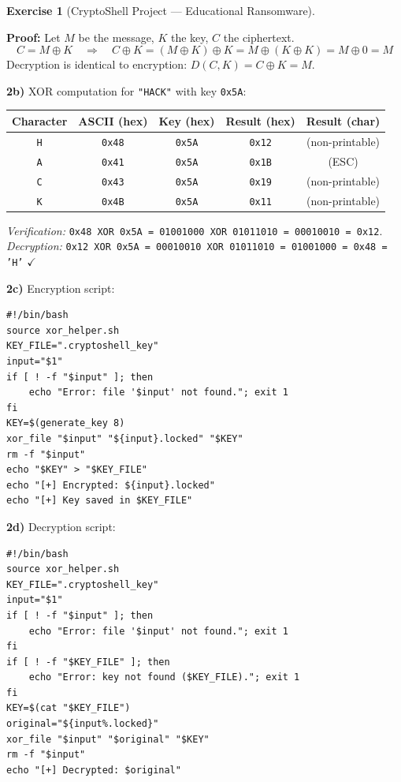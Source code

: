 \documentclass[a4paper,11pt]{article}
\theoremstyle{plain}
\theoremstyle{definition}
\newtheorem{exercice}{Exercise}
\begin{document}
\begin{exercice}[CryptoShell Project --- Educational Ransomware]
\begin{correction}
\textbf{Proof:} Let $M$ be the message, $K$ the key, $C$ the ciphertext.
\[C = M \oplus K \quad \Rightarrow \quad C \oplus K = (M \oplus K) \oplus K = M \oplus (K \oplus K) = M \oplus 0 = M\]
Decryption is identical to encryption: $D(C, K) = C \oplus K = M$.

\medskip
\textbf{2b)} XOR computation for \texttt{"HACK"} with key \texttt{0x5A}:

\begin{center}
\begin{tabular}{ccccc}
\toprule
\textbf{Character} & \textbf{ASCII (hex)} & \textbf{Key (hex)} & \textbf{Result (hex)} & \textbf{Result (char)} \\
\midrule
\texttt{H} & \texttt{0x48} & \texttt{0x5A} & \texttt{0x12} & (non-printable) \\
\texttt{A} & \texttt{0x41} & \texttt{0x5A} & \texttt{0x1B} & (ESC) \\
\texttt{C} & \texttt{0x43} & \texttt{0x5A} & \texttt{0x19} & (non-printable) \\
\texttt{K} & \texttt{0x4B} & \texttt{0x5A} & \texttt{0x11} & (non-printable) \\
\bottomrule
\end{tabular}
\end{center}

\textit{Verification:} \texttt{0x48 XOR 0x5A = 01001000 XOR 01011010 = 00010010 = 0x12}. \\
\textit{Decryption:} \texttt{0x12 XOR 0x5A = 00010010 XOR 01011010 = 01001000 = 0x48 = 'H'} $\checkmark$

\medskip
\textbf{2c)} Encryption script:
\begin{lstlisting}[title=encrypt.sh]
#!/bin/bash
source xor_helper.sh
KEY_FILE=".cryptoshell_key"
input="$1"
if [ ! -f "$input" ]; then
    echo "Error: file '$input' not found."; exit 1
fi
KEY=$(generate_key 8)
xor_file "$input" "${input}.locked" "$KEY"
rm -f "$input"
echo "$KEY" > "$KEY_FILE"
echo "[+] Encrypted: ${input}.locked"
echo "[+] Key saved in $KEY_FILE"
\end{lstlisting}

\textbf{2d)} Decryption script:
\begin{lstlisting}[title=decrypt.sh]
#!/bin/bash
source xor_helper.sh
KEY_FILE=".cryptoshell_key"
input="$1"
if [ ! -f "$input" ]; then
    echo "Error: file '$input' not found."; exit 1
fi
if [ ! -f "$KEY_FILE" ]; then
    echo "Error: key not found ($KEY_FILE)."; exit 1
fi
KEY=$(cat "$KEY_FILE")
original="${input%.locked}"
xor_file "$input" "$original" "$KEY"
rm -f "$input"
echo "[+] Decrypted: $original"
\end{lstlisting}


\end{correction}
\end{exercice}
\end{document}
